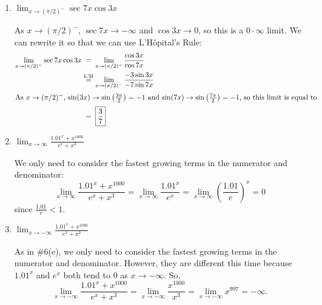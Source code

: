 \documentclass[main]{subfiles}
\begin{document}
\begin{enumerate}
\begin{enumerate}
  \pspace{\newpage}

  \item
    \begin{problem}[\vfill]
      $\displaystyle \lim_{x \to (\pi / 2)^-} \sec 7x \cos 3x$
    \end{problem}

    \begin{solution}
      As $x \to (\pi/2)^-$, $\sec 7x \to -\infty$ and $\cos 3x \to 0$, so
      this is a $0 \cdot \infty$ limit.  We can rewrite it so that we can
      use L'Hôpital's Rule:
      \begin{align*}
        \lim_{x \to (\pi / 2)^-} \sec 7x \cos 3x & \nolheq \lim_{x \to
          (\pi / 2)^-} \frac{\cos 3x}{ \cos 7x} \\
        & \lheq \lim_{x \to (\pi / 2)^-} \frac{-3\sin 3x}{ -7\sin 7x} \\
        \intertext{As $x \to (\pi/2)^-$, $\sin (3x) \to \sin \left(
            \frac{3 \pi}{2} \right) = -1$ and $\sin(7x) \to \sin \left(
            \frac{7 \pi}{2} \right) = -1$, so this limit is equal to } %
        & \nolheq \boxed{\frac{3}{7}}
      \end{align*}
    \end{solution}

    \item
      \begin{problem}[\vfill]
        $\displaystyle \lim_{x \to \infty} \frac{1.01^x + x^{1000}}{e^x +
          x^{3}}$
      \end{problem}

      \begin{solution} %
        We only need to consider the fastest growing terms in the
        numerator and denominator:
        \[ \lim_{x \to \infty} \frac{1.01^x + x^{1000}}{e^x + x^3} =
        \lim_{x \to \infty} \frac{1.01^x}{e^x} = \lim_{x \to \infty}
        \left( \frac{1.01}{e} \right)^x = \boxed{0}\] since
        $\frac{1.01}{e} < 1$.
      \end{solution}

    \item
      \begin{problem}[\vfill]
        $\displaystyle \lim_{x \to -\infty} \frac{1.01^x + x^{1000}}{e^x +
          x^{3}}$
      \end{problem}

      \begin{solution} %
        As in {{{{\#6}}(e)}}, we only
        need to consider the fastest growing terms in the numerator and
        denominator.  However, they are different this time because
        $1.01^x$ and $e^x$ both tend to 0 as $x \to -\infty$.  So, 
        \[ \lim_{x \to -\infty} \frac{1.01^x + x^{1000}}{e^x + x^3} =
        \lim_{x \to -\infty} \frac{x^{1000}}{x^3} = \lim_{x \to -\infty}
        x^{997} = \boxed{-\infty}. \]
      \end{solution}


\end{enumerate}
\end{enumerate}
\end{document}
